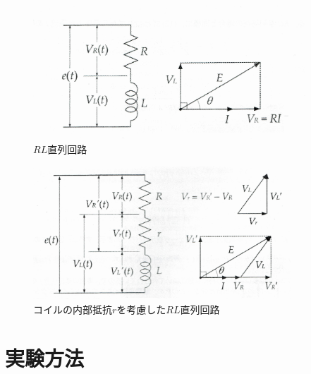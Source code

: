 \documentclass[12pt]{jarticle}
\begin{document}
\clearpage

\begin{figure}[t]
    \begin{center}
        \includegraphics[bb=0 0 3151 1536,height=5cm]{report3_fig3.25.jpg}
    \end{center}
    \caption{$RL$直列回路}
    \label{fig2}
\end{figure}
\begin{figure}[t]
    \begin{center}
        \includegraphics[bb=0 0 3420 1766,height=5cm]{report3_fig3.26.jpg}
    \end{center}
    \caption{コイルの内部抵抗$r$を考慮した$RL$直列回路}
    \label{fig3}
\end{figure}

\section{実験方法}
\end{document}
